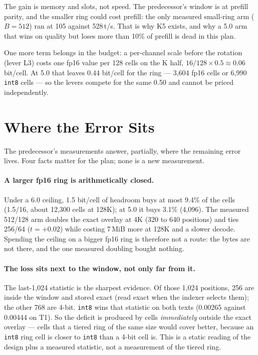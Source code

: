\documentclass[10pt,twocolumn]{article}
\begin{document}
The gain is memory and slots, not speed. The predecessor's window is at prefill parity, and the smaller ring could cost prefill: the only measured small-ring arm ($B{=}512$) ran at 105 against 528\,t/s. That is why K5 exists, and why a 5.0 arm that wins on quality but loses more than 10\% of prefill is dead in this plan.

One more term belongs in the budget: a per-channel scale before the rotation (lever L3) costs one fp16 value per 128 cells on the K half, $16/128 \times 0.5 \approx 0.06$ bit/cell. At 5.0 that leaves 0.44 bit/cell for the ring --- 3,604 fp16 cells or 6,990 \texttt{int8} cells --- so the levers compete for the same 0.50 and cannot be priced independently.

\section{Where the Error Sits}\label{sec:error}

The predecessor's measurements answer, partially, where the remaining error lives. Four facts matter for the plan; none is a new measurement.

\paragraph{A larger fp16 ring is arithmetically closed.} Under a 6.0 ceiling, 1.5 bit/cell of headroom buys at most 9.4\% of the cells (1.5/16, about 12,300 cells at 128K); at 5.0 it buys 3.1\% (4,096). The measured 512/128 arm doubles the exact overlay at 4K (320 to 640 positions) and ties 256/64 ($t{=}+0.02$) while costing 7\,MiB more at 128K and a slower decode. Spending the ceiling on a bigger fp16 ring is therefore not a route: the bytes are not there, and the one measured doubling bought nothing.

\paragraph{The loss sits next to the window, not only far from it.} The last-1,024 statistic is the sharpest evidence. Of those 1,024 positions, 256 are inside the window and stored exact (read exact when the indexer selects them); the other 768 are 4-bit. \texttt{int8} wins that statistic on both texts (0.00265 against 0.00444 on T1). So the deficit is produced by cells \emph{immediately} outside the exact overlay --- cells that a tiered ring of the same size would cover better, because an \texttt{int8} ring cell is closer to \texttt{int8} than a 4-bit cell is. This is a static reading of the design plus a measured statistic, not a measurement of the tiered ring.
\end{document}
